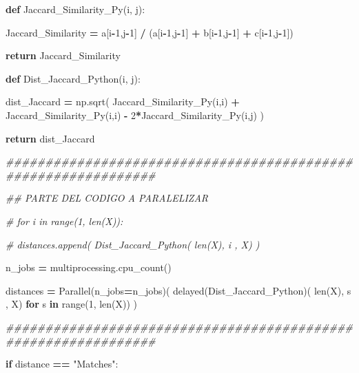 \documentclass[
  11pt,
  a4paper,
]{article}
\newenvironment{Shaded}{\begin{snugshade}}{\end{snugshade}}
\newcommand{\BuiltInTok}[1]{#1}
\newcommand{\CommentTok}[1]{\textcolor[rgb]{0.56,0.35,0.01}{\textit{#1}}}
\newcommand{\ControlFlowTok}[1]{\textcolor[rgb]{0.13,0.29,0.53}{\textbf{#1}}}
\newcommand{\DecValTok}[1]{\textcolor[rgb]{0.00,0.00,0.81}{#1}}
\newcommand{\KeywordTok}[1]{\textcolor[rgb]{0.13,0.29,0.53}{\textbf{#1}}}
\newcommand{\NormalTok}[1]{#1}
\newcommand{\OperatorTok}[1]{\textcolor[rgb]{0.81,0.36,0.00}{\textbf{#1}}}
\newcommand{\StringTok}[1]{\textcolor[rgb]{0.31,0.60,0.02}{#1}}
\begin{document}
\begin{Shaded}
\begin{Highlighting}[]
        \KeywordTok{def}\NormalTok{ Jaccard\_Similarity\_Py(i, j):}

\NormalTok{            Jaccard\_Similarity }\OperatorTok{=}\NormalTok{ a[i}\OperatorTok{{-}}\DecValTok{1}\NormalTok{,j}\OperatorTok{{-}}\DecValTok{1}\NormalTok{] }\OperatorTok{/}\NormalTok{ (a[i}\OperatorTok{{-}}\DecValTok{1}\NormalTok{,j}\OperatorTok{{-}}\DecValTok{1}\NormalTok{] }\OperatorTok{+}\NormalTok{ b[i}\OperatorTok{{-}}\DecValTok{1}\NormalTok{,j}\OperatorTok{{-}}\DecValTok{1}\NormalTok{] }\OperatorTok{+}\NormalTok{ c[i}\OperatorTok{{-}}\DecValTok{1}\NormalTok{,j}\OperatorTok{{-}}\DecValTok{1}\NormalTok{])}
            
            \ControlFlowTok{return}\NormalTok{ Jaccard\_Similarity}


        \KeywordTok{def}\NormalTok{ Dist\_Jaccard\_Python(i, j):}

\NormalTok{            dist\_Jaccard }\OperatorTok{=}\NormalTok{ np.sqrt( Jaccard\_Similarity\_Py(i,i) }\OperatorTok{+}\NormalTok{ Jaccard\_Similarity\_Py(i,i) }\OperatorTok{{-}} \DecValTok{2}\OperatorTok{*}\NormalTok{Jaccard\_Similarity\_Py(i,j) )}

            \ControlFlowTok{return}\NormalTok{ dist\_Jaccard}

\CommentTok{\#\#\#\#\#\#\#\#\#\#\#\#\#\#\#\#\#\#\#\#\#\#\#\#\#\#\#\#\#\#\#\#\#\#\#\#\#\#\#\#\#\#\#\#\#\#\#\#\#\#\#\#\#\#\#\#\#\#\#\#\#\#\#}

    \CommentTok{\#\# PARTE DEL CODIGO A PARALELIZAR}

       \CommentTok{\# for i in range(1, len(X)):}

        \CommentTok{\#    distances.append( Dist\_Jaccard\_Python( len(X), i , X) )}

\NormalTok{        n\_jobs  }\OperatorTok{=}\NormalTok{ multiprocessing.cpu\_count()}

\NormalTok{        distances }\OperatorTok{=}\NormalTok{ Parallel(n\_jobs}\OperatorTok{=}\NormalTok{n\_jobs)( delayed(Dist\_Jaccard\_Python)( }\BuiltInTok{len}\NormalTok{(X), s , X) }\ControlFlowTok{for}\NormalTok{ s }\KeywordTok{in} \BuiltInTok{range}\NormalTok{(}\DecValTok{1}\NormalTok{, }\BuiltInTok{len}\NormalTok{(X)) )}

\CommentTok{\#\#\#\#\#\#\#\#\#\#\#\#\#\#\#\#\#\#\#\#\#\#\#\#\#\#\#\#\#\#\#\#\#\#\#\#\#\#\#\#\#\#\#\#\#\#\#\#\#\#\#\#\#\#\#\#\#\#\#\#\#\#\#}
    
    \ControlFlowTok{if}\NormalTok{ distance }\OperatorTok{==} \StringTok{"Matches"}\NormalTok{:}


\end{Highlighting}
\end{Shaded}
\end{document}
